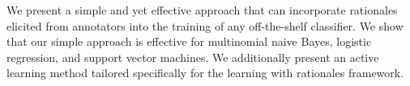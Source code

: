 We present a simple and yet effective approach that can incorporate rationales elicited from annotators into the training of any off-the-shelf classifier. We show that our simple approach is effective for multinomial naive Bayes, logistic regression, and support vector machines. We additionally present an active learning method tailored specifically for the learning with rationales framework.
